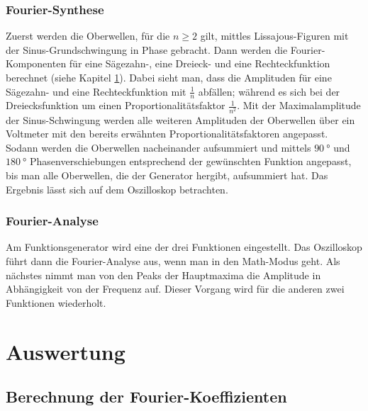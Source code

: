 \subsubsection{Fourier-Synthese}
Zuerst werden die Oberwellen, für die $n \ge 2$ gilt, mittles Lissajous-Figuren
mit der Sinus-Grundschwingung in Phase gebracht. Dann werden die Fourier-Komponenten
für eine Sägezahn-, eine Dreieck- und eine Rechteckfunktion berechnet (siehe Kapitel \ref{sec:auswertung}).
Dabei sieht man, dass die Amplituden für eine Sägezahn- und eine Rechteckfunktion mit
$\frac{1}{n}$ abfällen; während es sich bei der Dreiecksfunktion um einen Proportionalitätsfaktor
$\frac{1}{n^2}$. Mit der Maximalamplitude der Sinus-Schwingung werden alle weiteren Amplituden
der Oberwellen über ein Voltmeter mit den bereits erwähnten Proportionalitätsfaktoren angepasst.
Sodann werden die Oberwellen nacheinander aufsummiert und mittels $\SI{90}{\degree}$ und
$\SI{180}{\degree}$ Phasenverschiebungen entsprechend der gewünschten Funktion angepasst,
bis man alle Oberwellen, die der Generator hergibt, aufsummiert hat. Das Ergebnis lässt
sich auf dem Oszilloskop betrachten.

\subsubsection{Fourier-Analyse}
Am Funktionsgenerator wird eine der drei Funktionen eingestellt. Das Oszilloskop
führt dann die Fourier-Analyse aus, wenn man in den Math-Modus geht. Als nächstes
nimmt man von den Peaks der Hauptmaxima die Amplitude in Abhängigkeit von der
Frequenz auf. Dieser Vorgang wird für die anderen zwei Funktionen wiederholt.

\section{Auswertung}
\label{sec:auswertung}
\subsection{Berechnung der Fourier-Koeffizienten}
\label{sec:koef}
